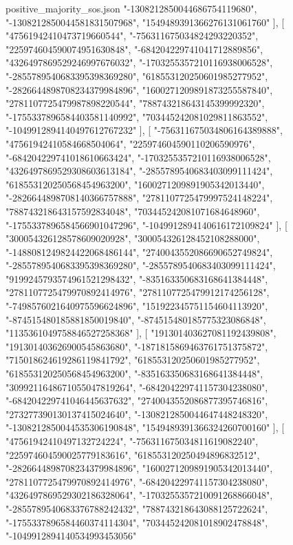 \begin{filecontents*}[overwrite]{positive_majority_sos.json}
    "-1308212850044686754119680",
    "-1308212850044581831507968",
    "1549489391366276131061760"
   ],
   [
    "47561942410473719660544",
    "-756311675034824293220352",
    "225974604590074951630848",
    "-684204229741041712889856",
    "4326497869529246997676032",
    "-1703255357210116938006528",
    "-2855789540683395398369280",
    "618553120250601985277952",
    "-2826644898708234379984896",
    "1600271209891873255587840",
    "2781107725479987898220544",
    "788743218643145399992320",
    "-1755337896584403581140992",
    "703445242081029811863552",
    "-1049912894140497612767232"
   ],
   [
    "-756311675034806164389888",
    "47561942410584668504064",
    "225974604590110206590976",
    "-684204229741018610663424",
    "-1703255357210116938006528",
    "4326497869529308603613184",
    "-2855789540683403099111424",
    "618553120250568454963200",
    "1600271209891905342013440",
    "-2826644898708140366757888",
    "2781107725479997524148224",
    "788743218643157592834048",
    "703445242081071684648960",
    "-1755337896584566901047296",
    "-1049912894140616172109824"
   ],
   [
    "300054326128578609020928",
    "300054326128452108288000",
    "-1488081249824422068486144",
    "2740043552086690652749824",
    "-2855789540683395398369280",
    "-2855789540683403099111424",
    "9199245793574961521298432",
    "-835163350683168641384448",
    "2781107725479970892414976",
    "2781107725479912174256128",
    "-7498576021640975596624896",
    "151922345751154604113920",
    "-874515480185881850019840",
    "-874515480185775323086848",
    "1135361049758846527258368"
   ],
   [
    "191301403627081192439808",
    "191301403626900545863680",
    "-1871815869463761751375872",
    "715018624619286119841792",
    "618553120250601985277952",
    "618553120250568454963200",
    "-835163350683168641384448",
    "3099211648671055047819264",
    "-684204229741157304238080",
    "-684204229741046445637632",
    "2740043552086877395746816",
    "273277390130137415024640",
    "-1308212850044647448248320",
    "-1308212850044535306190848",
    "1549489391366324260700160"
   ],
   [
    "47561942410497132724224",
    "-756311675034811619082240",
    "225974604590025779183616",
    "618553120250494896832512",
    "-2826644898708234379984896",
    "1600271209891905342013440",
    "2781107725479970892414976",
    "-684204229741157304238080",
    "4326497869529302186328064",
    "-1703255357210091268866048",
    "-2855789540683376788242432",
    "788743218643088125722624",
    "-1755337896584460374114304",
    "703445242081018902478848",
    "-1049912894140534993453056"

\end{filecontents*}
